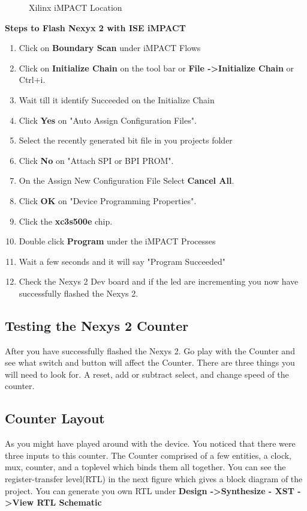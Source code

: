 \documentclass{article}
\begin{document}
\begin{figure}[!htb]
  \centering
  \caption{Xilinx iMPACT Location}
\end{figure}

\textbf{Steps to Flash Nexyx 2 with ISE iMPACT}
\begin{enumerate}
  \item Click on \textbf{Boundary Scan} under iMPACT Flows\
  \item Click on \textbf{Initialize Chain} on the tool bar or \textbf{File -\textgreater Initialize Chain} or Ctrl+i.
  \item Wait till it identify Succeeded on the Initialize Chain
  \item Click \textbf{Yes} on "Auto Assign Configuration Files".
  \item Select the recently generated bit file in you projects folder
  \item Click \textbf{No} on "Attach SPI or BPI PROM".
  \item On the Assign New Configuration File Select \textbf{Cancel All}.
  \item Click \textbf{OK} on "Device Programming Properties".
  \item Click the \textbf{xc3s500e} chip.
  \item Double click \textbf{Program} under the iMPACT Processes
  \item Wait a few seconds and it will say "Program Succeeded"
  \item Check the Nexys 2 Dev board and if the led are incrementing you now have successfully flashed the Nexys 2.
\end{enumerate}

\subsection{Testing the Nexys 2 Counter}
After you have successfully flashed the Nexys 2. Go play with the Counter and see what switch and button will affect the Counter. There are three things you will need to look for. A reset, add or subtract select, and change speed of the counter.

\subsection{Counter Layout}
As you might have played around with the device. You noticed that there were three inputs to this counter. The Counter comprised of a few entities, a clock, mux, counter, and a toplevel which binds them all together. You can see the register-transfer level(RTL) in the next figure which gives a block diagram of the project. You can generate you own RTL under \textbf{Design -\textgreater Synthesize - XST -\textgreater View RTL Schematic}
\end{document}
